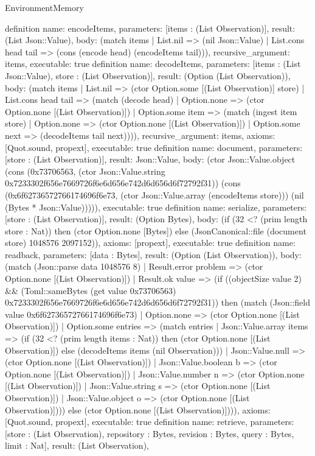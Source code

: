 \begin{lexlean}{EnvironmentMemory}
\begin{semanticmodule}
{}
definition{
 name: encodeItems, parameters: [items : (List Observation)], result: (List Json::Value),
 body: (match items | List.nil => (nil Json::Value) | List.cons head tail => (cons (encode head) (encodeItems tail))), recursive_argument: items, executable: true
}
definition{
 name: decodeItems, parameters: [items : (List Json::Value), store : (List Observation)], result: (Option (List Observation)),
 body: (match items | List.nil => (ctor Option.some [(List Observation)] store) | List.cons head tail => (match (decode head) | Option.none => (ctor Option.none [(List Observation)]) | Option.some item => (match (ingest item store) | Option.none => (ctor Option.none [(List Observation)]) | Option.some next => (decodeItems tail next)))), recursive_argument: items, axioms: [Quot.sound, propext], executable: true
}
definition{
 name: document, parameters: [store : (List Observation)], result: Json::Value,
 body: (ctor Json::Value.object (cons (0x73706563, (ctor Json::Value.string 0x7233302f656e7669726f6e6d656e742d6d656d6f72792f31)) (cons (0x6f62736572766174696f6e73, (ctor Json::Value.array (encodeItems store))) (nil (Bytes * Json::Value))))), executable: true
}
definition{
 name: serialize, parameters: [store : (List Observation)], result: (Option Bytes),
 body: (if (32 <? (prim length store : Nat)) then (ctor Option.none [Bytes]) else (JsonCanonical::file (document store) 1048576 2097152)), axioms: [propext], executable: true
}
definition{
 name: readback, parameters: [data : Bytes], result: (Option (List Observation)),
 body: (match (Json::parse data 1048576 8) | Result.error problem => (ctor Option.none [(List Observation)]) | Result.ok value => (if ((objectSize value 2) && (Toml::sameBytes (get value 0x73706563) 0x7233302f656e7669726f6e6d656e742d6d656d6f72792f31)) then (match (Json::field value 0x6f62736572766174696f6e73) | Option.none => (ctor Option.none [(List Observation)]) | Option.some entries => (match entries | Json::Value.array items => (if (32 <? (prim length items : Nat)) then (ctor Option.none [(List Observation)]) else (decodeItems items (nil Observation))) | Json::Value.null => (ctor Option.none [(List Observation)]) | Json::Value.boolean b => (ctor Option.none [(List Observation)]) | Json::Value.number n => (ctor Option.none [(List Observation)]) | Json::Value.string s => (ctor Option.none [(List Observation)]) | Json::Value.object o => (ctor Option.none [(List Observation)]))) else (ctor Option.none [(List Observation)]))), axioms: [Quot.sound, propext], executable: true
}
definition{
 name: retrieve, parameters: [store : (List Observation), repository : Bytes, revision : Bytes, query : Bytes, limit : Nat], result: (List Observation),
}
\end{semanticmodule}
\end{lexlean}
